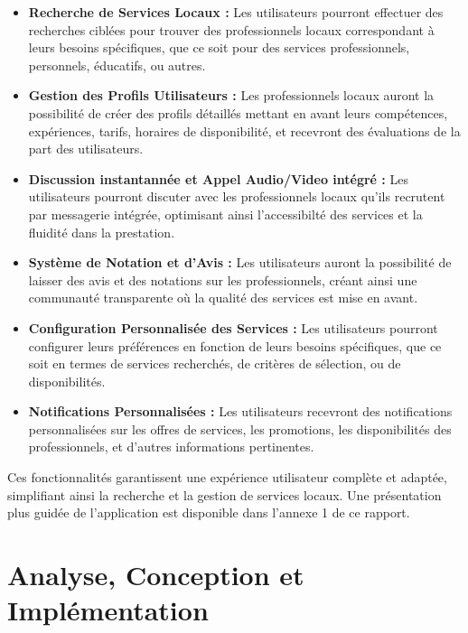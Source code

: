 \begin{itemize}
    \item \textbf{Recherche de Services Locaux :} Les utilisateurs pourront effectuer des recherches ciblées pour trouver des professionnels locaux correspondant à leurs besoins spécifiques, que ce soit pour des services professionnels, personnels, éducatifs, ou autres.

    \item \textbf{Gestion des Profils Utilisateurs :} Les professionnels locaux auront la possibilité de créer des profils détaillés mettant en avant leurs compétences, expériences, tarifs, horaires de disponibilité, et recevront des évaluations de la part des utilisateurs.

    \item \textbf{Discussion instantannée et Appel Audio/Video intégré :} Les utilisateurs pourront discuter avec les professionnels locaux qu'ils recrutent par messagerie intégrée, optimisant ainsi l'accessibilté des services et la fluidité dans la prestation.

    \item \textbf{Système de Notation et d'Avis :} Les utilisateurs auront la possibilité de laisser des avis et des notations sur les professionnels, créant ainsi une communauté transparente où la qualité des services est mise en avant.

    \item \textbf{Configuration Personnalisée des Services :} Les utilisateurs pourront configurer leurs préférences en fonction de leurs besoins spécifiques, que ce soit en termes de services recherchés, de critères de sélection, ou de disponibilités.

    \item \textbf{Notifications Personnalisées :} Les utilisateurs recevront des notifications personnalisées sur les offres de services, les promotions, les disponibilités des professionnels, et d'autres informations pertinentes.

\end{itemize}

\vspace{0.5cm}

Ces fonctionnalités garantissent une expérience utilisateur complète et adaptée, simplifiant ainsi la recherche et la gestion de services locaux. Une présentation plus guidée de l'application est disponible dans l'annexe 1 de ce rapport.

\chapter{Analyse, Conception et Implémentation}

